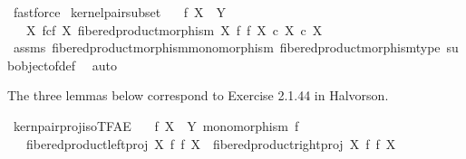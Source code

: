 \begin{isabellebody}
\ fastforce\isanewline
{}\isamarkupfalse%
%
\endisatagproof
{\isafoldproof}%
%
\isadelimproof
\isanewline
%
\endisadelimproof
\isanewline
{}\isamarkupfalse%
\ kernel{\isacharunderscore}{\kern0pt}pair{\isacharunderscore}{\kern0pt}subset{\isacharcolon}{\kern0pt}\isanewline
\ \ \ {\isachardoublequoteopen}f{\isacharcolon}{\kern0pt}\ X\ {\isasymrightarrow}\ Y{\isachardoublequoteclose}\isanewline
\ \ \ {\isachardoublequoteopen}{\isacharparenleft}{\kern0pt}X\ \isactrlbsub f\isactrlesub {\isasymtimes}\isactrlsub c\isactrlbsub f\isactrlesub \ X{\isacharcomma}{\kern0pt}\ fibered{\isacharunderscore}{\kern0pt}product{\isacharunderscore}{\kern0pt}morphism\ X\ f\ f\ X{\isacharparenright}{\kern0pt}\ {\isasymsubseteq}\isactrlsub c\ X\ {\isasymtimes}\isactrlsub c\ X{\isachardoublequoteclose}\isanewline
%
\isadelimproof
\ \ %
\endisadelimproof
%
\isatagproof
{}\isamarkupfalse%
\ assms\ fibered{\isacharunderscore}{\kern0pt}product{\isacharunderscore}{\kern0pt}morphism{\isacharunderscore}{\kern0pt}monomorphism\ fibered{\isacharunderscore}{\kern0pt}product{\isacharunderscore}{\kern0pt}morphism{\isacharunderscore}{\kern0pt}type\ subobject{\isacharunderscore}{\kern0pt}of{\isacharunderscore}{\kern0pt}def{}\ \isamarkupfalse%
\ auto%
\endisatagproof
{\isafoldproof}%
%
\isadelimproof
%
\endisadelimproof
%
\begin{isamarkuptext}%
The three lemmas below correspond to Exercise 2.1.44 in Halvorson.%
\end{isamarkuptext}\isamarkuptrue%
\isamarkupfalse%
\ kern{\isacharunderscore}{\kern0pt}pair{\isacharunderscore}{\kern0pt}proj{\isacharunderscore}{\kern0pt}iso{\isacharunderscore}{\kern0pt}TFAE{}{\isacharcolon}{\kern0pt}\isanewline
\ \ \ {\isachardoublequoteopen}f{\isacharcolon}{\kern0pt}\ X\ {\isasymrightarrow}\ Y{\isachardoublequoteclose}\ {\isachardoublequoteopen}monomorphism\ f{\isachardoublequoteclose}\isanewline
\ \ \ {\isachardoublequoteopen}{\isacharparenleft}{\kern0pt}fibered{\isacharunderscore}{\kern0pt}product{\isacharunderscore}{\kern0pt}left{\isacharunderscore}{\kern0pt}proj\ X\ f\ f\ X{\isacharparenright}{\kern0pt}\ {\isacharequal}{\kern0pt}\ {\isacharparenleft}{\kern0pt}fibered{\isacharunderscore}{\kern0pt}product{\isacharunderscore}{\kern0pt}right{\isacharunderscore}{\kern0pt}proj\ X\ f\ f\ X{\isacharparenright}{\kern0pt}{\isachardoublequoteclose}\isanewline
%
\isadelimproof
%
\endisadelimproof
%
\isatagproof
{}\isamarkupfalse%

\end{isabellebody}
